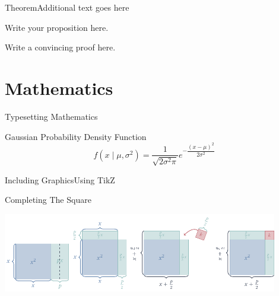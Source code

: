 \documentclass[aspectratio=169, sectionpages]{beamer}
\begin{document}
\begin{frame}{Theorem}{Additional text goes here}

	Write your proposition here.

	\proof Write a convincing proof here.
\end{frame}

\section{Mathematics}


\begin{frame}[fragile]{Typesetting Mathematics}
	\begin{block}{Gaussian Probability Density Function}
		\[
			f \left(x \mid \mu, \sigma^2 \right) = \dfrac{1}{\sqrt{2 \sigma^2 \pi}} e^{- \dfrac{(x-\mu)^2}{2\sigma^2}}
		\]
	\end{block}

\end{frame}

\begin{frame}[c]{Including Graphics}{Using TikZ}
	\begin{block}{Completing The Square}
		\begin{center}
			\includegraphics[width=0.9\textwidth]{imgs.tikz.058w}
		\end{center}
	\end{block}
\end{frame}
\end{document}
